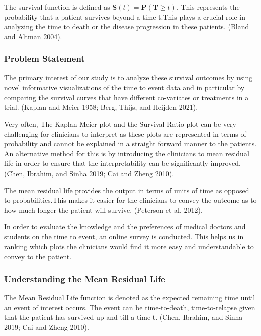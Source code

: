 \documentclass{article}
\begin{document}
The survival function is defined as \(\mathbf{S}(t) = \mathbf{P}(\mathbf{T} \geq t)\). This represents the probability that a patient survives beyond a time t.This plays a crucial role in analyzing the time to death or the disease progression in these patients. (Bland and Altman 2004).

\subsubsection{Problem Statement}\label{problem-statement}

The primary interest of our study is to analyze these survival outcomes by using novel informative visualizations of the time to event data and in particular by comparing the survival curves that have different co-variates or treatments in a trial. (Kaplan and Meier 1958; Berg, Thijs, and Heijden 2021).

Very often, The Kaplan Meier plot and the Survival Ratio plot can be very challenging for clinicians to interpret as these plots are represented in terms of probability and cannot be explained in a straight forward manner to the patients. An alternative method for this is by introducing the clinicians to mean residual life in order to ensure that the interpretability can be significantly improved. (Chen, Ibrahim, and Sinha 2019; Cai and Zheng 2010).

The mean residual life provides the output in terms of units of time as opposed to probabilities.This makes it easier for the clinicians to convey the outcome as to how much longer the patient will survive. (Peterson et al. 2012).

In order to evaluate the knowledge and the preferences of medical doctors and students on the time to event, an online survey is conducted. This helps us in ranking which plots the clinicians would find it more easy and understandable to convey to the patient.

\subsubsection{Understanding the Mean Residual Life}\label{understanding-the-mean-residual-life}

The Mean Residual Life function is denoted as the expected remaining time until an event of interest occurs. The event can be time-to-death, time-to-relapse given that the patient has survived up and till a time t. (Chen, Ibrahim, and Sinha 2019; Cai and Zheng 2010).
\end{document}
